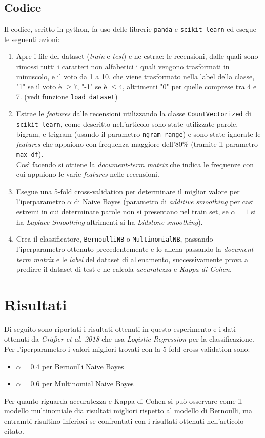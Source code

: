 \documentclass{article}
\begin{document}
\subsection{Codice}
Il codice, scritto in python, fa uso delle librerie \texttt{panda} e \texttt{scikit-learn}
ed esegue le seguenti azioni:
\begin{enumerate}
	\item Apre i file del dataset (\textit{train} e \textit{test}) e ne estrae:
	      le recensioni, dalle quali sono rimossi tutti i caratteri non alfabetici i quali
	      vengono trasformati in minuscolo, e il voto da 1 a 10, che viene trasformato
	      nella label della classe, "1" se il voto è $\geq7$, "-1" se è $\leq4$,
	      altrimenti "0" per quelle comprese tra 4 e 7.
	      (vedi funzione \texttt{load\_dataset})
	\item Estrae le \textit{features} dalle recensioni utilizzando la classe
	      \texttt{CountVectorized} di \texttt{scikit-learn}, come descritto nell'articolo
	      sono state utilizzate parole, bigram, e trigram (usando il parametro
	      \texttt{ngram\_range}) e sono state ignorate le \textit{features} che appaiono
	      con frequenza maggiore dell'80\% (tramite il parametro \texttt{max\_df}).\\
	      Così facendo si ottiene la \textit{document-term matrix} che indica le frequenze
	      con cui appaiono le varie \textit{features} nelle recensioni.
	\item Esegue una 5-fold cross-validation per determinare il miglior valore per
	      l'iperparametro $\alpha$ di Naive Bayes (parametro di \textit{additive smoothing}
	      per casi estremi in cui determinate parole non si presentano nel train set,
	      se $\alpha=1$ si ha \textit{Laplace Smoothing} altrimenti si ha
	      \textit{Lidstone smoothing}).
	\item Crea il classificatore, \texttt{BernoulliNB} o \texttt{MultinomialNB}, passando
	      l'iperparametro ottenuto precedentemente e lo allena passando la
	      \textit{document-term matrix} e le \textit{label} del dataset di allenamento,
	      successivamente prova a predirre il dataset di test e ne calcola
	      \textit{accuratezza} e \textit{Kappa di Cohen}.
\end{enumerate}

\section{Risultati}
Di seguito sono riportati i risultati ottenuti in questo esperimento e i dati ottenuti da
\textit{Gräßer et al. 2018} che usa \textit{Logistic Regression} per la classificazione.
Per l'iperparametro i valori migliori trovati con la 5-fold cross-validation sono:
\begin{itemize}
	\item $\alpha=0.4$ per Bernoulli Naive Bayes
	\item $\alpha=0.6$ per Multinomial Naive Bayes
\end{itemize}
Per quanto riguarda accuratezza e Kappa di Cohen si può osservare come il modello multinomiale
dia risultati migliori rispetto al modello di Bernoulli, ma entrambi risultino inferiori
se confrontati con i risultati ottenuti nell'articolo citato.
\end{document}
